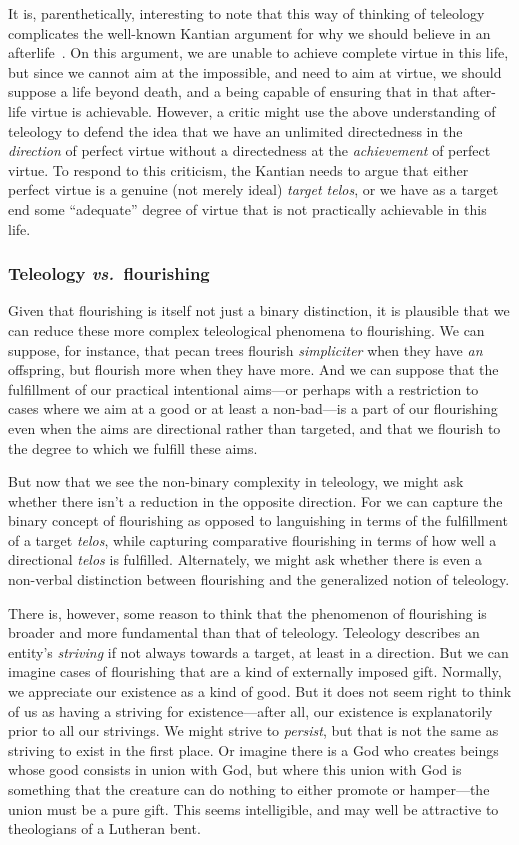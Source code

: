 It is, parenthetically, interesting to note that this way of thinking of teleology complicates the well-known 
Kantian argument for why we should believe in 
an afterlife~\parencite{Surprenant}. On this argument, we are unable to achieve complete virtue in this life, but since we cannot aim at
the impossible, and need to aim at virtue, we should suppose a life beyond death, and a being capable of ensuring that in that after-life virtue
is achievable. However, a critic might use the above understanding of teleology to defend the idea that we have an unlimited 
directedness in the \textit{direction} of perfect virtue without a directedness at the \textit{achievement} of perfect virtue. To respond to this criticism, the Kantian needs to  argue that either perfect virtue is a genuine (not merely 
ideal) \textit{target telos}, or we have as a target end some ``adequate'' degree of virtue that is not
practically achievable in this life.

\subsubsection{Teleology \textit{vs.}\ flourishing}
Given that flourishing is itself not just a binary distinction, it is plausible that we can reduce these more
complex teleological phenomena to flourishing. We can suppose, for instance, that pecan trees flourish 
\textit{simpliciter} when they have \textit{an} offspring, but flourish more when they have more. And we can
suppose that the fulfillment of our practical intentional aims---or perhaps with a restriction to
cases where we aim at a good or at least a non-bad---is a part of our flourishing even when the aims are
directional rather than targeted, and that we flourish to the degree to which we fulfill these aims. 

But now that we see the non-binary complexity in teleology, we might ask whether there isn't a reduction
in the opposite direction. For we can capture the binary concept of flourishing as opposed to languishing
in terms of the fulfillment of a target \textit{telos}, while capturing comparative flourishing in terms
of how well a directional \textit{telos} is fulfilled. Alternately, we might ask whether there is even 
a non-verbal distinction between flourishing and the generalized notion of teleology. 

There is, however, some reason to think that the phenomenon of flourishing is broader and more fundamental
than that of teleology. Teleology describes an entity's \textit{striving} if not always towards a target,
at least in a direction. But we can imagine cases of flourishing that are a kind of externally imposed
gift. Normally, we appreciate our existence as a kind of good. But it does not seem right to think of us
as having a striving for existence---after all, our existence is explanatorily prior to all our strivings.
We might strive to \textit{persist}, but that is not the same as striving to exist  in the first place.
Or imagine there is a God who creates beings whose good consists in union with God, but where this
union with God is something that the creature can do nothing to either promote or hamper---the union must 
be a pure gift. This seems intelligible, and may well be attractive to theologians of a Lutheran bent.

